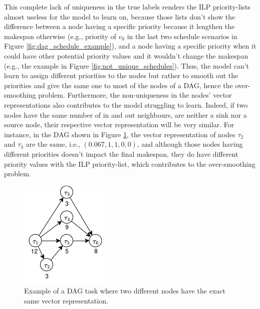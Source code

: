 This complete lack of uniqueness in the true labels 
renders the ILP priority-lists almost useless
for the model to learn on, because those lists
don't show the difference between a node having 
a specific priority because it lengthen the makespan otherwise (e.g.,
priority of $v_8$ in the last two schedule scenarios in Figure \ref{fig:dag_schedule_example}),
and a node having a specific priority when it could have 
other potential priority values and it wouldn't change the makespan (e.g.,
the example in Figure \ref{fig:not_unique_schedules}).
Thus, the model can't learn to assign different priorities
to the nodes but rather to smooth out the priorities and give
the same one to most of the nodes of a DAG,
hence the over-smoothing problem.
Furthermore, the non-uniqueness in the nodes' vector representations
also contributes to the model struggling to learn.
Indeed, 
if two nodes have the same number of in and out neighbours,
are neither a sink nor a source node, their respective
vector representation will be very similar.
For instance, in the DAG shown in Figure \ref{fig:dag_same_representation_vector},
the vector representation of nodes $\tau_2$ and $\tau_3$ are the same,
i.e., $(0.067, 1, 1, 0, 0)$, and although those nodes having different priorities
doesn't impact the final makespan, they do have different priority values
with the ILP priority-list, which contributes to the over-smoothing problem. 
\begin{figure}
    \centering
    \includegraphics[width=0.5\linewidth]{images/dag_similarity_representation.png}
    \caption{Example of a DAG task where two different nodes have the
    exact same vector representation.}
    \label{fig:dag_same_representation_vector}
\end{figure}

